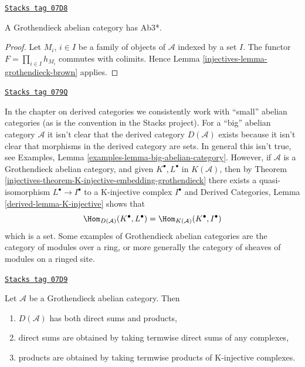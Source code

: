 \begin{lemma}
\label{injectives-lemma-grothendieck-products}
\href{https://stacks.math.columbia.edu/tag/07D8}{\texttt{Stacks tag 07D8}}

A Grothendieck abelian category has Ab3*.
\end{lemma}

\begin{proof}

Let $M_i$, $i \in I$ be a family of objects of $\mathcal{A}$ indexed
by a set $I$. The functor $F = \prod_{i \in I} h_{M_i}$
commutes with colimits. Hence
Lemma \ref{injectives-lemma-grothendieck-brown}
applies.
\end{proof}

\begin{remark}[Existence D]
\label{injectives-remark-existence-D}
\href{https://stacks.math.columbia.edu/tag/079Q}{\texttt{Stacks tag 079Q}}

In the chapter on derived categories we consistently work with
``small'' abelian categories (as is the convention in the Stacks
project). For a ``big'' abelian category $\mathcal{A}$ it isn't clear
that the derived category $D(\mathcal{A})$ exists because it isn't
clear that morphisms in the derived category are sets. In general this
isn't true, see
Examples, Lemma \ref{examples-lemma-big-abelian-category}.
However, if $\mathcal{A}$ is a Grothendieck abelian category, and given
$K^\bullet, L^\bullet$ in $K(\mathcal{A})$, then by
Theorem \ref{injectives-theorem-K-injective-embedding-grothendieck}
there exists a quasi-isomorphism $L^\bullet \to I^\bullet$ to a
K-injective complex $I^\bullet$ and
Derived Categories, Lemma \ref{derived-lemma-K-injective} shows that
$$
\Hom_{D(\mathcal{A})}(K^\bullet, L^\bullet) =
\Hom_{K(\mathcal{A})}(K^\bullet, I^\bullet)
$$
which is a set. Some examples of Grothendieck abelian categories
are the category of modules over a ring, or more generally
the category of sheaves of modules on a ringed site.
\end{remark}

\begin{lemma}
\label{injectives-lemma-derived-products}
\href{https://stacks.math.columbia.edu/tag/07D9}{\texttt{Stacks tag 07D9}}

Let $\mathcal{A}$ be a Grothendieck abelian category.
Then
\begin{enumerate}
\item $D(\mathcal{A})$ has both direct sums and products,
\item direct sums are obtained by taking termwise direct sums of
any complexes,
\item products are obtained by taking termwise products of
K-injective complexes.
\end{enumerate}
\end{lemma}

